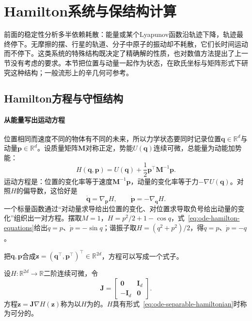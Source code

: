
\section{Hamilton系统与保结构计算}
\label{sec:ode-hamiltonian}

前面的稳定性分析多半依赖耗散：能量或某个Lyapunov函数沿轨迹下降，轨迹最终停下。无摩擦的摆、行星的轨道、分子中原子的振动却不耗散，它们长时间运动而不停下。这类系统的特殊结构既决定了精确解的性质，也对数值方法提出了上一节没有考虑的要求。本节把位置与动量一起作为状态，在欧氏坐标与矩阵形式下研究这种结构；一般流形上的辛几何可参考。

\subsection{Hamilton方程与守恒结构}
\label{sec:ode-hamilton-equations}

\paragraph{从能量写出运动方程}
位置相同而速度不同的物体有不同的未来，所以力学状态要同时记录位置$\bm q\in\mathbb R^d$与动量$\bm p\in\mathbb R^d$。设质量矩阵$\bm M$对称正定，势能$U(\bm q)$连续可微，总能量为动能加势能：
\begin{equation}
  H(\bm q,\bm p)=U(\bm q)+\frac12\bm p^\top\bm M^{-1}\bm p.
  \label{eq:ode-separable-hamiltonian}
\end{equation}
运动方程是：位置的变化率等于速度$\bm M^{-1}\bm p$，动量的变化率等于力$-\nabla U(\bm q)$。对照$H$的偏导数，这恰好是
\begin{equation}
  \dot{\bm q}=\nabla_{\bm p}H,\qquad\dot{\bm p}=-\nabla_{\bm q}H.
  \label{eq:ode-hamilton-equations}
\end{equation}
一个标量函数通过“对动量求导给出位置的变化、对位置求导取负号给出动量的变化”组织出一对方程。摆取$M=1$，$H=p^2/2+1-\cos q$，式~\eqref{eq:ode-hamilton-equations}给出$\dot q=p$、$\dot p=-\sin q$；谐振子取$H=(q^2+p^2)/2$，得$\dot q=p$、$\dot p=-q$。

把$\bm q,\bm p$合成$\bm z=(\bm q^\top,\bm p^\top)^\top\in\mathbb R^{2d}$，方程可以写成一个式子。

\begin{definition}[Hamilton系统]
  \label{def:ode-hamiltonian-system}
  设$H:\mathbb R^{2d}\to\mathbb R$二阶连续可微，令
  \[
    \bm J=\begin{bmatrix}\bm0&\bm I_d\\-\bm I_d&\bm0\end{bmatrix}.
  \]
  方程$\dot{\bm z}=\bm J\nabla H(\bm z)$称为以$H$为的。$H$具有形式~\eqref{eq:ode-separable-hamiltonian}时称为可分的。
\end{definition}

